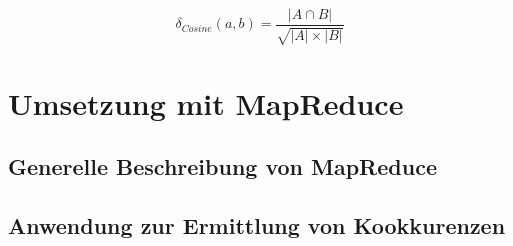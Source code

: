 \[
\delta_{Cosine}(a, b) = \frac{|A \cap B|}{\sqrt{|A| \times |B|}}
\]

\section{Umsetzung mit MapReduce}

\subsection{Generelle Beschreibung von MapReduce}

\subsection{Anwendung zur Ermittlung von Kookkurenzen}